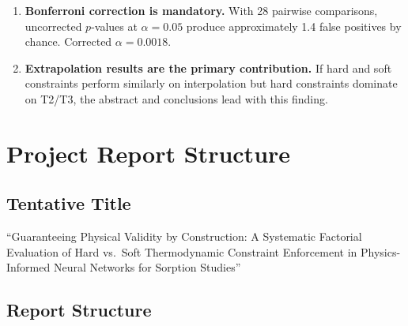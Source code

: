 \documentclass[12pt,a4paper]{article}
\begin{document}
\begin{warningbox}
\begin{enumerate}[noitemsep]
  \item \textbf{Bonferroni correction is mandatory.} With 28 pairwise
    comparisons, uncorrected $p$-values at $\alpha=0.05$ produce
    approximately 1.4 false positives by chance. Corrected $\alpha=0.0018$.

  \item \textbf{Extrapolation results are the primary contribution.}
    If hard and soft constraints perform similarly on interpolation
    but hard constraints dominate on T2/T3, the abstract and conclusions
    lead with this finding.
\end{enumerate}
\end{warningbox}

\section{Project Report Structure}

\subsection{Tentative Title}

``Guaranteeing Physical Validity by Construction: A Systematic
Factorial Evaluation of Hard vs.\ Soft Thermodynamic Constraint
Enforcement in Physics-Informed Neural Networks for Sorption Studies''

\subsection{Report Structure}
\end{document}

